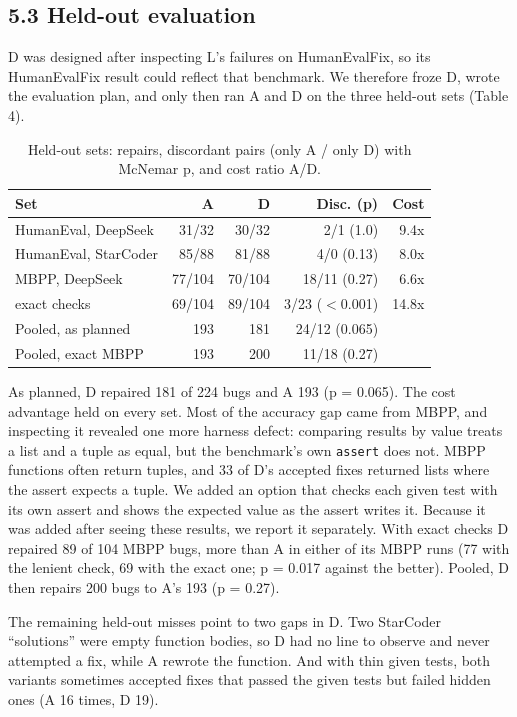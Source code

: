 \documentclass[
  10pt,
  twocolumn]{article}
\begin{document}
\hypertarget{held-out-evaluation}{%
\subsection{5.3 Held-out evaluation}\label{held-out-evaluation}}

D was designed after inspecting L's failures on HumanEvalFix, so its
HumanEvalFix result could reflect that benchmark. We therefore froze D,
wrote the evaluation plan, and only then ran A and D on the three
held-out sets (Table 4).

\begin{table}[h]\small\centering
\caption{Held-out sets: repairs, discordant pairs (only A / only D) with McNemar p, and cost ratio A/D.}
\begin{tabular}{lrrrr}\toprule
Set & A & D & Disc. (p) & Cost \\ \midrule
HumanEval, DeepSeek & 31/32 & 30/32 & 2/1 (1.0) & 9.4x \\
HumanEval, StarCoder & 85/88 & 81/88 & 4/0 (0.13) & 8.0x \\
MBPP, DeepSeek & 77/104 & 70/104 & 18/11 (0.27) & 6.6x \\
\quad exact checks & 69/104 & 89/104 & 3/23 ($<$0.001) & 14.8x \\ \midrule
Pooled, as planned & 193 & 181 & 24/12 (0.065) & \\
Pooled, exact MBPP & 193 & 200 & 11/18 (0.27) & \\ \bottomrule
\end{tabular}\end{table}

As planned, D repaired 181 of 224 bugs and A 193 (p = 0.065). The cost
advantage held on every set. Most of the accuracy gap came from MBPP,
and inspecting it revealed one more harness defect: comparing results by
value treats a list and a tuple as equal, but the benchmark's own
\texttt{assert} does not. MBPP functions often return tuples, and 33 of
D's accepted fixes returned lists where the assert expects a tuple. We
added an option that checks each given test with its own assert and
shows the expected value as the assert writes it. Because it was added
after seeing these results, we report it separately. With exact checks D
repaired 89 of 104 MBPP bugs, more than A in either of its MBPP runs (77
with the lenient check, 69 with the exact one; p = 0.017 against the
better). Pooled, D then repairs 200 bugs to A's 193 (p = 0.27).

The remaining held-out misses point to two gaps in D. Two StarCoder
``solutions'' were empty function bodies, so D had no line to observe
and never attempted a fix, while A rewrote the function. And with thin
given tests, both variants sometimes accepted fixes that passed the
given tests but failed hidden ones (A 16 times, D 19).
\end{document}
